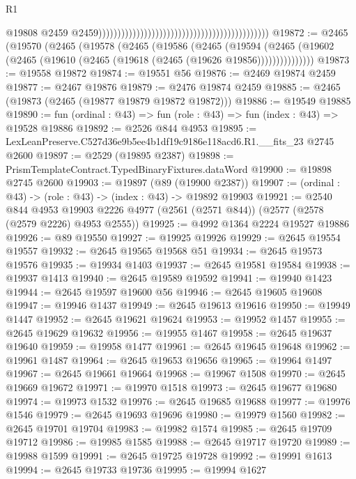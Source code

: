 \begin{lexlean}{R1}
\begin{coremodule}
                                                                                              @19808
                                                                                              @2459
                                                                                              @2459)))))))))))))))))))))))))))))))))))))))))))))
@19872 := @2465
    (@19570
      (@2465
        (@19578
          (@2465
            (@19586
              (@2465
                (@19594
                  (@2465 (@19602 (@2465 (@19610 (@2465 (@19618 (@2465 (@19626 @19856)))))))))))))))
@19873 := @19558 @19872
@19874 := @19551 @56
@19876 := @2469 @19874 @2459
@19877 := @2467 @19876
@19879 := @2476 @19874 @2459
@19885 := @2465 (@19873 (@2465 (@19877 @19879 @19872 @19872)))
@19886 := @19549 @19885
@19890 := fun (ordinal : @43) => fun (role : @43) => fun (index : @43) => @19528 @19886
@19892 := @2526 @844 @4953
@19895 := LexLeanPreserve.C527d36e9b5ee4b1df19c9186e118acd6.R1.__fits_23 @2745 @2600
@19897 := @2529 (@19895 @2387)
@19898 := PrismTemplateContract.TypedBinaryFixtures.dataWord
@19900 := @19898 @2745 @2600
@19903 := @19897 (@89 (@19900 @2387))
@19907 := (ordinal : @43) -> (role : @43) -> (index : @43) -> @19892 @19903
@19921 := @2540
    @844
    @4953
    @19903
    @2226
    @4977
    (@2561 (@2571 @844))
    (@2577 (@2578 (@2579 @2226) @4953 @2555))
@19925 := @4992 @1364 @2224 @19527 @19886
@19926 := @89 @19550
@19927 := @19925 @19926
@19929 := @2645 @19554 @19557
@19932 := @2645 @19565 @19568 @51
@19934 := @2645 @19573 @19576
@19935 := @19934 @1403
@19937 := @2645 @19581 @19584
@19938 := @19937 @1413
@19940 := @2645 @19589 @19592
@19941 := @19940 @1423
@19944 := @2645 @19597 @19600 @56
@19946 := @2645 @19605 @19608
@19947 := @19946 @1437
@19949 := @2645 @19613 @19616
@19950 := @19949 @1447
@19952 := @2645 @19621 @19624
@19953 := @19952 @1457
@19955 := @2645 @19629 @19632
@19956 := @19955 @1467
@19958 := @2645 @19637 @19640
@19959 := @19958 @1477
@19961 := @2645 @19645 @19648
@19962 := @19961 @1487
@19964 := @2645 @19653 @19656
@19965 := @19964 @1497
@19967 := @2645 @19661 @19664
@19968 := @19967 @1508
@19970 := @2645 @19669 @19672
@19971 := @19970 @1518
@19973 := @2645 @19677 @19680
@19974 := @19973 @1532
@19976 := @2645 @19685 @19688
@19977 := @19976 @1546
@19979 := @2645 @19693 @19696
@19980 := @19979 @1560
@19982 := @2645 @19701 @19704
@19983 := @19982 @1574
@19985 := @2645 @19709 @19712
@19986 := @19985 @1585
@19988 := @2645 @19717 @19720
@19989 := @19988 @1599
@19991 := @2645 @19725 @19728
@19992 := @19991 @1613
@19994 := @2645 @19733 @19736
@19995 := @19994 @1627

\end{coremodule}
\end{lexlean}
